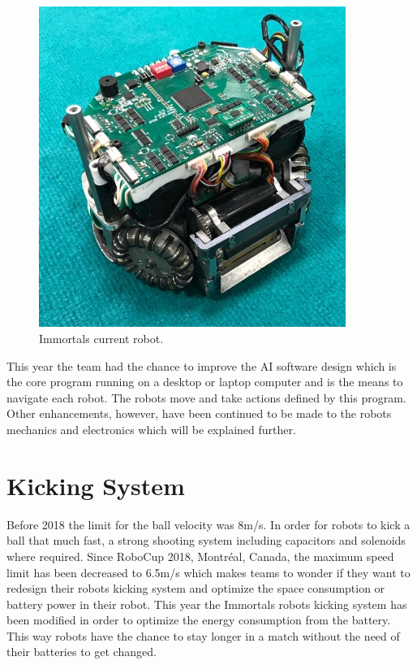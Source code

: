 \documentclass[runningheads]{llncs}
\begin{document}
\begin{figure}
\centering
\includegraphics[width=10cm]{images/std_robot.jpeg}
\caption{Immortals current robot.} \label{fig_std_robot}
\end{figure}

This year the team had the chance to improve the AI software design which is the core program running on a desktop or laptop computer and is the means to navigate each robot. The robots move and take actions defined by this program. Other enhancements, however, have been continued to be made to the robots mechanics and electronics which will be explained further.

\section{Kicking System}
Before 2018 the limit for the ball velocity was 8m/s. In order for robots to kick a ball that much fast, a strong shooting system including capacitors and solenoids where required. Since RoboCup 2018, Montréal, Canada, the maximum speed limit has been decreased to 6.5m/s which makes teams to wonder if they want to redesign their robots kicking system and optimize the space consumption or battery power in their robot. This year the Immortals robots kicking system has been modified in order to optimize the energy consumption from the battery. This way robots have the chance to stay longer in a match without the need of their batteries to get changed.
\end{document}

